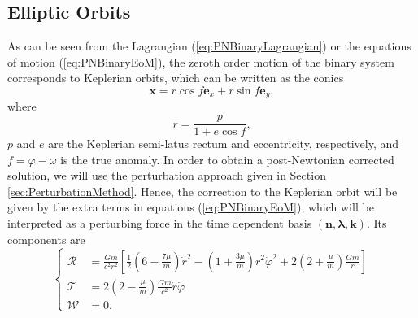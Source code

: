 \subsection{Elliptic Orbits} 
As can be seen from the Lagrangian (\ref{eq:PNBinaryLagrangian}) or the equations of motion (\ref{eq:PNBinaryEoM}), the zeroth order motion of the binary system corresponds to Keplerian orbits, which can be written as the conics
\begin{equation}
\textbf{x} = r \cos f \textbf{e}_x + r \sin f \textbf{e}_y , \label{eq:PNBinaryRelativePosition}
\end{equation}
where
\begin{equation}
r = \frac{p}{1+e \cos f}, \label{eq:PNBinaryRadius}
\end{equation}
$p$ and $e$ are the Keplerian semi-latus rectum and eccentricity, respectively,  and $f=\varphi - \omega$ is the true anomaly. In order to obtain a post-Newtonian corrected solution, we will use the perturbation approach given in Section \ref{sec:PerturbationMethod}. Hence, the correction to the Keplerian orbit will be given by the extra terms in equations (\ref{eq:PNBinaryEoM}), which will be interpreted as a perturbing force in the time dependent basis $(\textbf{n}, \boldsymbol{\lambda}, \textbf{k})$. Its components are
 \begin{equation} 
\begin{cases}
\mathcal{R} &= \frac{Gm}{c^2r^2} \left[ \frac{1}{2} \left( 6 - \frac{7\mu}{m} \right) \dot{r}^2 - \left( 1 + \frac{3\mu}{m}\right) r^2 \dot{\varphi}^2 + 2\left(2 + \frac{\mu}{m} \right) \frac{Gm}{r} \right] \\
\mathcal{T} &= 2\left( 2 - \frac{\mu}{m}\right) \frac{Gm}{c^2} \dot{r} \dot{\varphi} \\
\mathcal{W} &= 0 .
\end{cases} 
\end{equation}

